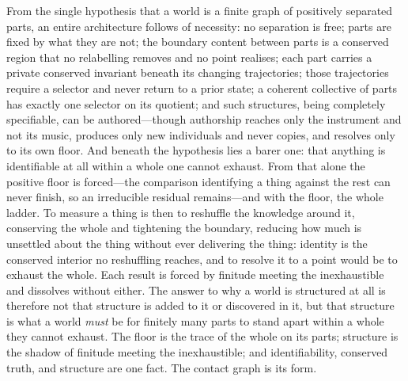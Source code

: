 From the single hypothesis that a world is a finite graph of positively separated
parts, an entire architecture follows of necessity: no separation is free; parts
are fixed by what they are not; the boundary content between parts is a conserved
region that no relabelling removes and no point realises; each part carries a
private conserved invariant beneath its changing trajectories; those trajectories
require a selector and never return to a prior state; a coherent collective of
parts has exactly one selector on its quotient; and such structures, being
completely specifiable, can be authored---though authorship reaches only the
instrument and not its music, produces only new individuals and never copies, and
resolves only to its own floor. And beneath the hypothesis lies a barer one: that anything is identifiable at all
within a whole one cannot exhaust. From that alone the positive floor is
forced---the comparison identifying a thing against the rest can never finish, so
an irreducible residual remains---and with the floor, the whole ladder. To
measure a thing is then to reshuffle the knowledge around it, conserving the whole
and tightening the boundary, reducing how much is unsettled about the thing
without ever delivering the thing: identity is the conserved interior no
reshuffling reaches, and to resolve it to a point would be to exhaust the whole.
Each result is forced by finitude meeting the inexhaustible and dissolves without
either. The answer to why a world is structured at all is therefore not that
structure is added to it or discovered in it, but that structure is what a world
\emph{must} be for finitely many parts to stand apart within a whole they cannot
exhaust. The floor is the trace of the whole on its parts; structure is the shadow
of finitude meeting the inexhaustible; and identifiability, conserved truth, and
structure are one fact. The contact graph is its form.





